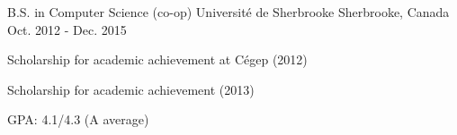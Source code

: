 


\begin{cventries}


\cventry
{B.S. in Computer Science (co-op)} %
{Université de Sherbrooke} %
{Sherbrooke, Canada} %
{Oct. 2012 - Dec. 2015} %
{ %
\begin{cvitems}
\item {Scholarship for academic achievement at Cégep (2012)}
\item {Scholarship for academic achievement (2013)}
\item {GPA: 4.1/4.3 (A average)}
\end{cvitems}
}



\vspace{1mm}
\end{cventries}